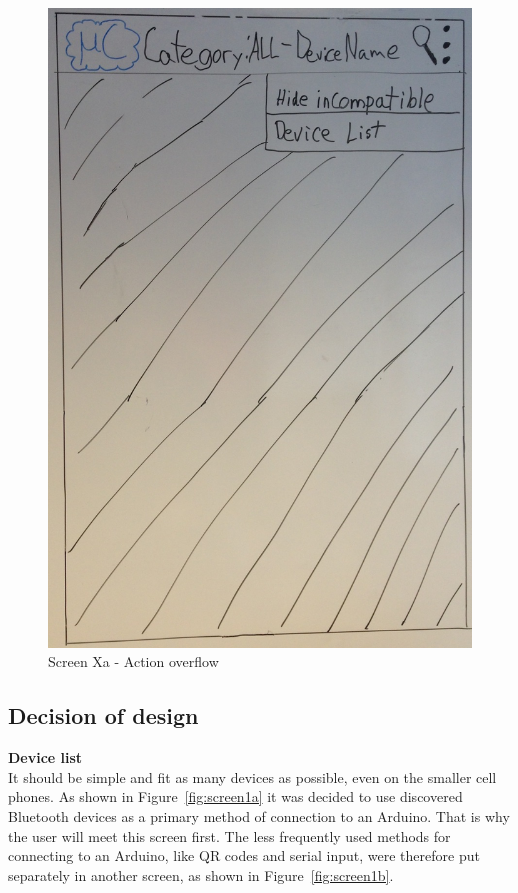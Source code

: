 \begin{figure}[H]
\centering
\includegraphics[scale=0.2]{images/Design_guide/ScreenXa.png}
\caption{Screen Xa - Action overflow}
\label{fig:screenXa}
\end{figure}

	\subsection{Decision of design}
	\textbf{Device list}\\
	It should be simple and fit as many devices as possible, even on the smaller cell phones. As shown in Figure~\ref{fig:screen1a} it was decided to use discovered Bluetooth devices as a primary method of connection to an Arduino. That is why the user will meet this screen first. The less frequently used methods for connecting to an Arduino, like QR codes and serial input, were therefore put separately in another screen, as shown in Figure~\ref{fig:screen1b}. \\


